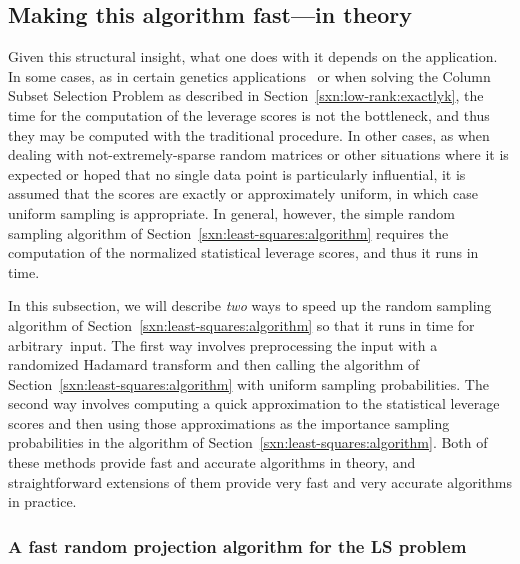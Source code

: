 \documentclass[twoside]{article}
\begin{document}
\subsection{Making this algorithm fast---in theory}
\label{sxn:least-squares:faster-th}

Given this structural insight, what one does with it depends on the 
application.
In some cases, as in certain genetics 
applications~\cite{Paschou07b,Paschou08a,CUR_PNAS} or when solving the Column Subset Selection Problem as
described in Section~\ref{sxn:low-rank:exactlyk}, the time for the 
computation of the leverage scores is not the bottleneck, and thus they may 
be computed with the traditional procedure. 
In other cases, as when dealing with not-extremely-sparse random matrices 
or other situations where it is expected or hoped that no single data point 
is particularly influential, it is assumed that the scores are exactly or 
approximately uniform, in which case uniform sampling is appropriate.
In general, however, the simple random sampling algorithm of 
Section~\ref{sxn:least-squares:algorithm} requires the computation of the
normalized statistical leverage scores, and thus it runs in  time.

In this subsection, we will describe \emph{two} ways to speed up the random 
sampling algorithm of Section~\ref{sxn:least-squares:algorithm} so that it 
runs in  time for arbitrary~input.
The first way involves preprocessing the input with a randomized Hadamard 
transform and then calling the algorithm of 
Section~\ref{sxn:least-squares:algorithm} with uniform sampling probabilities.
The second way involves computing a quick approximation to the statistical 
leverage scores and then using those approximations as the importance sampling 
probabilities in the algorithm of Section~\ref{sxn:least-squares:algorithm}. 
Both of these methods provide fast and accurate algorithms in 
theory, and straightforward extensions of them provide very fast and very 
accurate algorithms in practice.


\subsubsection{A fast random projection algorithm for the LS problem}
\label{sxn:least-squares:faster-th:rand-proj}
\end{document}
